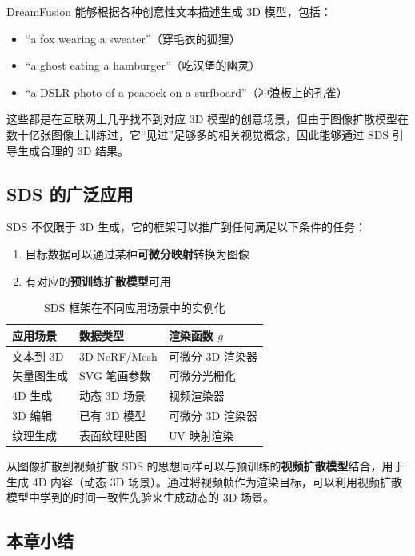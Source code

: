 \documentclass[a4paper]{article}
\begin{document}
DreamFusion 能够根据各种创意性文本描述生成 3D 模型，包括：
\begin{itemize}
    \item ``a fox wearing a sweater''（穿毛衣的狐狸）
    \item ``a ghost eating a hamburger''（吃汉堡的幽灵）
    \item ``a DSLR photo of a peacock on a surfboard''（冲浪板上的孔雀）
\end{itemize}

这些都是在互联网上几乎找不到对应 3D 模型的创意场景，但由于图像扩散模型在数十亿张图像上训练过，它``见过''足够多的相关视觉概念，因此能够通过 SDS 引导生成合理的 3D 结果。

\subsection{SDS 的广泛应用}

SDS 不仅限于 3D 生成，它的框架可以推广到任何满足以下条件的任务：
\begin{enumerate}
    \item 目标数据可以通过某种\textbf{可微分映射}转换为图像
    \item 有对应的\textbf{预训练扩散模型}可用
\end{enumerate}

\begin{table}[H]
\centering
\begin{tabular}{lll}
\toprule
\textbf{应用场景} & \textbf{数据类型} & \textbf{渲染函数 $g$} \\
\midrule
文本到 3D & 3D NeRF/Mesh & 可微分 3D 渲染器 \\
矢量图生成 & SVG 笔画参数 & 可微分光栅化 \\
4D 生成 & 动态 3D 场景 & 视频渲染器 \\
3D 编辑 & 已有 3D 模型 & 可微分 3D 渲染器 \\
纹理生成 & 表面纹理贴图 & UV 映射渲染 \\
\bottomrule
\end{tabular}
\caption{SDS 框架在不同应用场景中的实例化}
\end{table}

\begin{knowledgebox}{从图像扩散到视频扩散}
SDS 的思想同样可以与预训练的\textbf{视频扩散模型}结合，用于生成 4D 内容（动态 3D 场景）。通过将视频帧作为渲染目标，可以利用视频扩散模型中学到的时间一致性先验来生成动态的 3D 场景。
\end{knowledgebox}

\subsection{本章小结}
\end{document}
